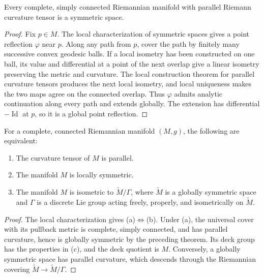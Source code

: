 \begin{theorem}
\label{thm:parallel-riemann-curvature-implies-symmetry}
Every complete, simply connected Riemannian manifold with parallel Riemann
curvature tensor is a symmetric space.
\begin{proof}
\sketch Fix $p\in M$.  The local characterization of symmetric spaces gives
a point reflection $\varphi$ near $p$.  Along any path from $p$, cover the
path by finitely many successive convex geodesic balls.  If a local isometry
has been constructed on one ball, its value and differential at a point of
the next overlap give a linear isometry preserving the metric and curvature.
The local construction theorem for parallel curvature tensors produces the
next local isometry, and local uniqueness makes the two maps agree on the
connected overlap.  Thus $\varphi$ admits analytic continuation along every
path and extends globally.  The extension has differential
$-\operatorname{Id}$ at $p$, so it is a global point reflection.
\end{proof}
\end{theorem}

\begin{corollary}
\label{cor:symmetric-space-equivalence}
For a complete, connected Riemannian manifold $(M,g)$, the following are
equivalent:
\begin{enumerate}
\item[(a)] The curvature tensor of $M$ is parallel.
\item[(b)] The manifold $M$ is locally symmetric.
\item[(c)] The manifold $M$ is isometric to $\widetilde M/\Gamma$, where
$\widetilde M$ is a globally symmetric space and $\Gamma$ is a discrete Lie
group acting freely, properly, and isometrically on $\widetilde M$.
\end{enumerate}
\begin{proof}
\sketch The local characterization gives (a)$\Leftrightarrow$(b).  Under (a),
the universal cover with its pullback metric is complete, simply connected,
and has parallel curvature, hence is globally symmetric by the preceding
theorem.  Its deck group has the properties in (c), and the deck quotient is
$M$.  Conversely, a globally symmetric space has parallel curvature, which
descends through the Riemannian covering $\widetilde M\to\widetilde M/\Gamma$.
\end{proof}
\end{corollary}

